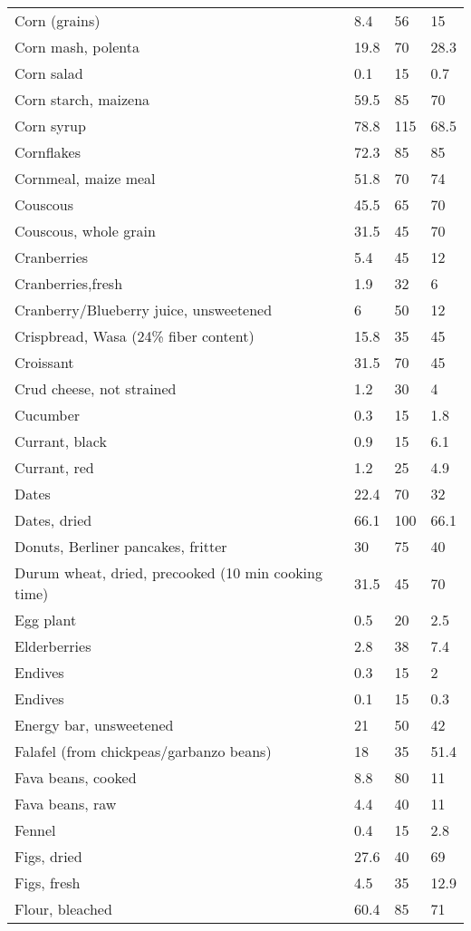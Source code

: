 \documentclass[../main.tex]{subfiles}
\begin{document}
\begin{longtable}{llll}
Corn (grains) & 8.4 & 56 & 15 \\
Corn mash, polenta & 19.8 & 70 & 28.3 \\
Corn salad & 0.1 & 15 & 0.7 \\
Corn starch, maizena & 59.5 & 85 & 70 \\
Corn syrup & 78.8 & 115 & 68.5 \\
Cornflakes & 72.3 & 85 & 85 \\
Cornmeal, maize meal & 51.8 & 70 & 74 \\
Couscous & 45.5 & 65 & 70 \\
Couscous, whole grain & 31.5 & 45 & 70 \\
Cranberries & 5.4 & 45 & 12 \\
Cranberries,fresh & 1.9 & 32 & 6 \\
Cranberry/Blueberry juice, unsweetened & 6 & 50 & 12 \\
Crispbread, Wasa (24\% fiber content) & 15.8 & 35 & 45 \\
Croissant & 31.5 & 70 & 45 \\
Crud cheese, not strained & 1.2 & 30 & 4 \\
Cucumber & 0.3 & 15 & 1.8 \\
Currant, black & 0.9 & 15 & 6.1 \\
Currant, red & 1.2 & 25 & 4.9 \\
Dates & 22.4 & 70 & 32 \\
Dates, dried & 66.1 & 100 & 66.1 \\
Donuts, Berliner pancakes, fritter & 30 & 75 & 40 \\
Durum wheat, dried, precooked (10 min cooking time) & 31.5 & 45 & 70 \\
Egg plant & 0.5 & 20 & 2.5 \\
Elderberries & 2.8 & 38 & 7.4 \\
Endives & 0.3 & 15 & 2 \\
Endives & 0.1 & 15 & 0.3 \\
Energy bar, unsweetened & 21 & 50 & 42 \\
Falafel (from chickpeas/garbanzo beans) & 18 & 35 & 51.4 \\
Fava beans, cooked & 8.8 & 80 & 11 \\
Fava beans, raw & 4.4 & 40 & 11 \\
Fennel & 0.4 & 15 & 2.8 \\
Figs, dried & 27.6 & 40 & 69 \\
Figs, fresh & 4.5 & 35 & 12.9 \\
Flour, bleached & 60.4 & 85 & 71 \\

\end{longtable}
\end{document}
